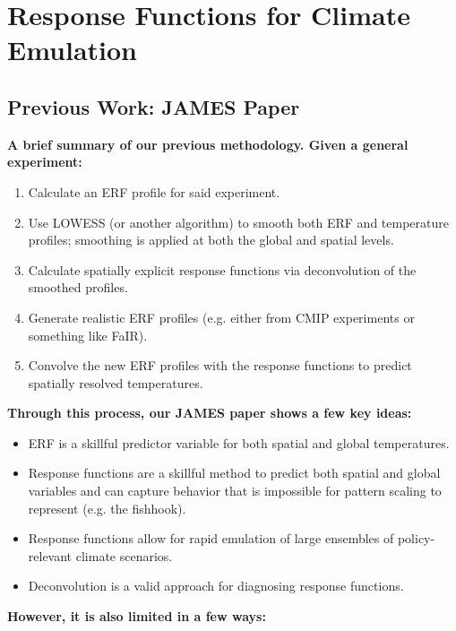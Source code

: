 \section{Response Functions for Climate Emulation}

\subsection{Previous Work: JAMES Paper}

\textbf{A brief summary of our previous methodology. Given a general experiment:}
\begin{enumerate}
  \item Calculate an ERF profile for said experiment.
  \item Use LOWESS (or another algorithm) to smooth both ERF and temperature profiles; smoothing is applied at both the global and spatial levels.
  \item Calculate spatially explicit response functions via deconvolution of the smoothed profiles.
  \item Generate realistic ERF profiles (e.g. either from CMIP experiments or something like FaIR).
  \item Convolve the new ERF profiles with the response functions to predict spatially resolved temperatures.
\end{enumerate}
\textbf{Through this process, our JAMES paper shows a few key ideas:}
\begin{itemize}
  \item ERF is a skillful predictor variable for both spatial and global temperatures.
  \item Response functions are a skillful method to predict both spatial and global variables and can capture behavior that is impossible for pattern scaling to represent (e.g. the fishhook).
  \item Response functions allow for rapid emulation of large ensembles of policy-relevant climate scenarios.
  \item Deconvolution is a valid approach for diagnosing response functions.
\end{itemize}
\textbf{However, it is also limited in a few ways:}
